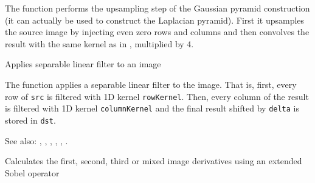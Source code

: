 The function performs the upsampling step of the Gaussian pyramid construction (it can actually be used to construct the Laplacian pyramid). First it upsamples the source image by injecting even zero rows and columns and then convolves the result with the same kernel as in , multiplied by 4.

Applies separable linear filter to an image

\begin{description}
\end{description}

The function applies a separable linear filter to the image. That is, first, every row of \texttt{src} is filtered with 1D kernel \texttt{rowKernel}. Then, every column of the result is filtered with 1D kernel \texttt{columnKernel} and the final result shifted by \texttt{delta} is stored in \texttt{dst}.

See also: , , , , , .

Calculates the first, second, third or mixed image derivatives using an extended Sobel operator

